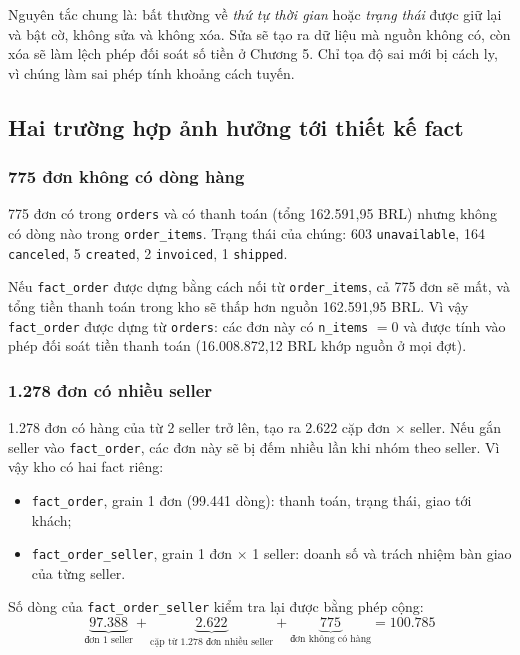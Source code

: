 Nguyên tắc chung là: bất thường về \emph{thứ tự thời gian} hoặc \emph{trạng thái} được giữ lại và bật cờ, không sửa và không xóa. Sửa sẽ tạo ra dữ liệu mà nguồn không có, còn xóa sẽ làm lệch phép đối soát số tiền ở Chương 5. Chỉ tọa độ sai mới bị cách ly, vì chúng làm sai phép tính khoảng cách tuyến.

\subsection{Hai trường hợp ảnh hưởng tới thiết kế fact}
\subsubsection*{775 đơn không có dòng hàng}
775 đơn có trong \texttt{orders} và có thanh toán (tổng 162.591,95 BRL) nhưng không có dòng nào trong \texttt{order\_items}. Trạng thái của chúng: 603 \texttt{unavailable}, 164 \texttt{canceled}, 5 \texttt{created}, 2 \texttt{invoiced}, 1 \texttt{shipped}.

Nếu \texttt{fact\_order} được dựng bằng cách nối từ \texttt{order\_items}, cả 775 đơn sẽ mất, và tổng tiền thanh toán trong kho sẽ thấp hơn nguồn 162.591,95 BRL. Vì vậy \texttt{fact\_order} được dựng từ \texttt{orders}: các đơn này có \texttt{n\_items} $= 0$ và được tính vào phép đối soát tiền thanh toán (16.008.872,12 BRL khớp nguồn ở mọi đợt).

\subsubsection*{1.278 đơn có nhiều seller}
1.278 đơn có hàng của từ 2 seller trở lên, tạo ra 2.622 cặp đơn $\times$ seller. Nếu gắn seller vào \texttt{fact\_order}, các đơn này sẽ bị đếm nhiều lần khi nhóm theo seller. Vì vậy kho có hai fact riêng:
\begin{itemize}
    \item \texttt{fact\_order}, grain 1 đơn (99.441 dòng): thanh toán, trạng thái, giao tới khách;
    \item \texttt{fact\_order\_seller}, grain 1 đơn $\times$ 1 seller: doanh số và trách nhiệm bàn giao của từng seller.
\end{itemize}
Số dòng của \texttt{fact\_order\_seller} kiểm tra lại được bằng phép cộng:
\begin{equation}
\underbrace{97.388}_{\text{đơn 1 seller}} + \underbrace{2.622}_{\text{cặp từ 1.278 đơn nhiều seller}} + \underbrace{775}_{\text{đơn không có hàng}} = 100.785
\end{equation}

